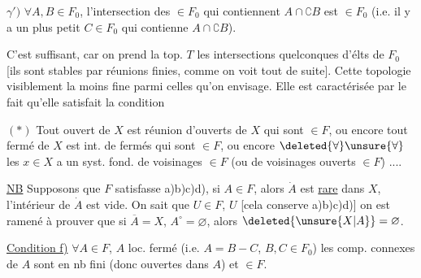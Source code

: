 

$\gamma')$ $\forall A,B\in F_0$, l'intersection des $\in F_0$ qui contiennent $A\cap\complement B$ est $\in F_0$ (i.e. il y a un plus petit $C\in F_0$ qui contienne $A\cap\complement B$).

C'est suffisant, car on prend la top. $T$  les intersections quelconques d'élts de $F_0$ [ils sont stables par réunions finies, comme on voit tout de suite]. Cette topologie   visiblement la moins fine parmi celles qu'on envisage. Elle est caractérisée par le fait qu'elle satisfait la condition

 $(*)$ Tout ouvert de $X$ est réunion d'ouverts de $X$ qui sont $\in F$, ou encore tout fermé de $X$ est int. de fermés qui sont $\in F$, ou encore $\deleted{\forall}\unsure{\forall}$ les $x\in X$ a un syst. fond. de voisinages $\in F$ (ou de voisinages ouverts $\in F$) ....


\uline{NB} Supposons que $F$ satisfasse a)b)c)d),   si $A\in F$, alors $\dot A$  est \uline{rare} dans $X$,  l'intérieur  de $\dot A$ est vide. On sait que $U\in F$,  $U$ [cela conserve a)b)c)d)] on est ramené à prouver que si $\overline A=X$, $A^\circ=\varnothing$, alors $\deleted{\unsure{X|A}}=\varnothing$. 



\uline{Condition f)} $\forall A\in F$, $A$ loc. fermé (i.e. $A=B-C$, $B,C\in F_0$) les comp. connexes de $A$ sont en nb fini (donc ouvertes dans $A$) et $\in F$.

